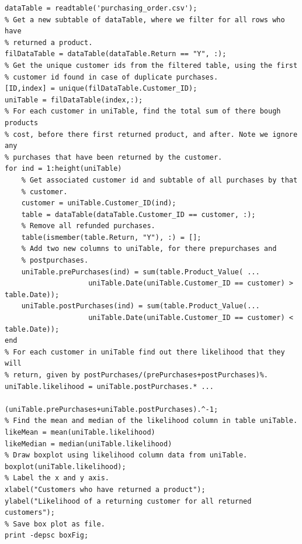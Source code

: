 \documentclass[12pt]{article}
\begin{document}
\begin{lstlisting}[caption={Question 2 full code},label={2_fullCode}]
% Read file and format into table.
dataTable = readtable('purchasing_order.csv');
% Get a new subtable of dataTable, where we filter for all rows who have
% returned a product.
filDataTable = dataTable(dataTable.Return == "Y", :);
% Get the unique customer ids from the filtered table, using the first
% customer id found in case of duplicate purchases.
[ID,index] = unique(filDataTable.Customer_ID);
uniTable = filDataTable(index,:);
% For each customer in uniTable, find the total sum of there bough products
% cost, before there first returned product, and after. Note we ignore any
% purchases that have been returned by the customer.
for ind = 1:height(uniTable)
    % Get associated customer id and subtable of all purchases by that
    % customer.
    customer = uniTable.Customer_ID(ind);
    table = dataTable(dataTable.Customer_ID == customer, :);
    % Remove all refunded purchases.
    table(ismember(table.Return, "Y"), :) = [];
    % Add two new columns to uniTable, for there prepurchases and
    % postpurchases.
    uniTable.prePurchases(ind) = sum(table.Product_Value( ...
                    uniTable.Date(uniTable.Customer_ID == customer) > table.Date));
    uniTable.postPurchases(ind) = sum(table.Product_Value(...
                    uniTable.Date(uniTable.Customer_ID == customer) < table.Date));
end
% For each customer in uniTable find out there likelihood that they will
% return, given by postPurchases/(prePurchases+postPurchases)%.
uniTable.likelihood = uniTable.postPurchases.* ...
                      (uniTable.prePurchases+uniTable.postPurchases).^-1;
% Find the mean and median of the likelihood column in table uniTable.
likeMean = mean(uniTable.likelihood)
likeMedian = median(uniTable.likelihood)
% Draw boxplot using likelihood column data from uniTable.
boxplot(uniTable.likelihood);
% Label the x and y axis.
xlabel("Customers who have returned a product");
ylabel("Likelihood of a returning customer for all returned customers");
% Save box plot as file.
print -depsc boxFig;
\end{lstlisting}
\end{document}
